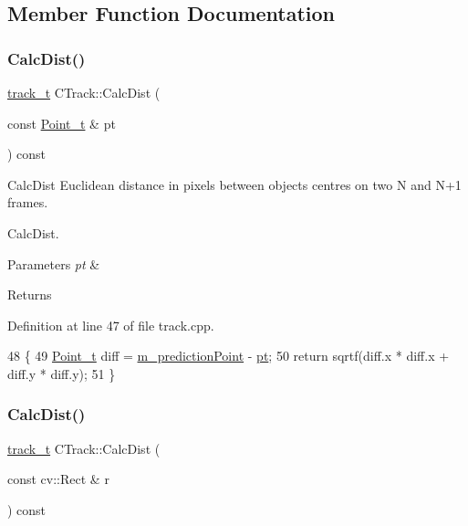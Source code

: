 \subsection{Member Function Documentation}
\mbox{\label{class_c_track_a7a3ba751123998349124ccaa2692acf5}} 
\subsubsection{\texorpdfstring{Calc\+Dist()}{CalcDist()}\hspace{0.1cm}{\footnotesize\ttfamily [1/2]}}
{\footnotesize\ttfamily \mbox{\hyperlink{defines_8h_a7ce9c8817b42ab418e61756f579549ab}{track\+\_\+t}} C\+Track\+::\+Calc\+Dist (\begin{DoxyParamCaption}\item[{const \mbox{\hyperlink{defines_8h_a8c42696da8f098b91374a8e8bb84b430}{Point\+\_\+t}} \&}]{pt }\end{DoxyParamCaption}) const}



Calc\+Dist Euclidean distance in pixels between objects centres on two N and N+1 frames. 

Calc\+Dist.


\begin{DoxyParams}{Parameters}
{\em pt} & \\
\hline
\end{DoxyParams}
\begin{DoxyReturn}{Returns}

\end{DoxyReturn}


Definition at line 47 of file track.\+cpp.


\begin{DoxyCode}
48 \{
49     \mbox{\hyperlink{defines_8h_a8c42696da8f098b91374a8e8bb84b430}{Point\_t}} diff = \mbox{\hyperlink{class_c_track_a8ee3f8baaf290aeb113f34c26a446a76}{m\_predictionPoint}} - \mbox{\hyperlink{rings_8cpp_af69bbacaaf68a115b351c5d1e29c3cc8}{pt}};
50     \textcolor{keywordflow}{return} sqrtf(diff.x * diff.x + diff.y * diff.y);
51 \}
\end{DoxyCode}
\mbox{\label{class_c_track_a4b354376efc03058801cbb84779d76ff}} 
\subsubsection{\texorpdfstring{Calc\+Dist()}{CalcDist()}\hspace{0.1cm}{\footnotesize\ttfamily [2/2]}}
{\footnotesize\ttfamily \mbox{\hyperlink{defines_8h_a7ce9c8817b42ab418e61756f579549ab}{track\+\_\+t}} C\+Track\+::\+Calc\+Dist (\begin{DoxyParamCaption}\item[{const cv\+::\+Rect \&}]{r }\end{DoxyParamCaption}) const}



